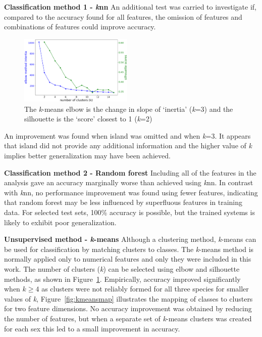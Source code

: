 \documentclass[a4paper, 11pt]{article}
\begin{document}
\textbf{Classification method 1 - \textit{k}nn}  
An additional test was carried to investigate if, compared to the accuracy found for all features, 
the omission of features and combinations of features could improve accuracy.
\begin{figure} %
  \centering
  \vspace{-0.5\baselineskip} %
  \includegraphics[width=0.48\textwidth]{kmeansvalue.png} %
  \vspace{-1.5\baselineskip} %
  \caption{\centering\linespread{0.8}\selectfont The \textit{k}-means elbow is the change in slope of `inertia' (\textit{k}=3)
  and the silhouette is the `score' closest to 1 (\textit{k}=2)}
  \vspace{-1\baselineskip} %
  \label{fig:kmeansvalue}
\end{figure}
An improvement was found when island was omitted and when \textit{k}=3. It appears that island did not provide 
any additional information and the higher value of \textit{k} implies better generalization may have been achieved.

\textbf{Classification method 2 - Random forest}  
Including all of the features in the analysis gave an accuracy marginally worse 
than achieved using \textit{k}nn. 
In contrast with \textit{k}nn, no performance improvement was found using fewer features, indicating that random forest
may be less influenced by superfluous features in training data. 
For selected test sets, 100\% accuracy is possible, but the trained systems is likely to exhibit poor generalization.

\textbf{Unsupervised method - \textit{k}-means}  
Although a clustering method, 
\textit{k}-means can be used for classification by matching clusters to classes. 
The \textit{k}-means method is normally applied only to numerical features and only they were included in this work. 
The number of clusters (\textit{k}) can be selected using elbow and silhouette methods, 
as shown in Figure~\ref{fig:kmeansvalue}. Empirically, accuracy improved significantly when \(k \geq 4\)
as clusters were not reliably formed for all three species for smaller values of \textit{k},  
Figure~\ref{fig:kmeansmap} illustrates the mapping of classes to clusters for two feature dimensions. 
No accuracy improvement was obtained by reducing the number of features, 
but when a separate set of \textit{k}-means clusters was created for each sex 
this led to a small improvement in accuracy. 
\end{document}
